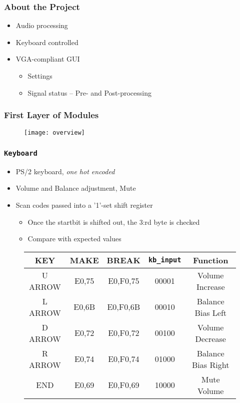 \begin{frame}
  \frametitle{About the Project}
    \begin{itemize}
      \item Audio processing
      \item Keyboard controlled
      \item VGA-compliant GUI
        \begin{itemize}
          \item Settings
          \item Signal status -- Pre- and Post-processing
        \end{itemize}
    \end{itemize}
\end{frame}

\begin{frame}
  \frametitle{First Layer of Modules}
    \begin{figure}
      \centering
      \texttt{[image: overview]}
    \end{figure}
\end{frame}

\begin{frame}
  \frametitle{\texttt{Keyboard}}
    \begin{itemize}
      \item PS/2 keyboard, \emph{one hot encoded}
      \item Volume and Balance adjustment, Mute
      \item Scan codes passed into a '1'-set shift register
        \begin{itemize}
          \item Once the startbit is shifted out, the 3:rd byte is checked
          \item Compare with expected values
        \end{itemize}
    \end{itemize}
    \begin{figure}
      \centering
      \begin{tabular}{|c|c|c|c|c|}
        \hline
        KEY & MAKE & BREAK & \texttt{kb\_input} & Function\\ \hline
        U ARROW & E0,75 & E0,F0,75 & 00001 & Volume Increase\\ \hline
        L ARROW & E0,6B & E0,F0,6B & 00010 & Balance Bias Left\\ \hline
        D ARROW & E0,72 & E0,F0,72 & 00100 & Volume Decrease\\ \hline
        R ARROW & E0,74 & E0,F0,74 & 01000 & Balance Bias Right\\ \hline
        END		& E0,69 & E0,F0,69 & 10000 & Mute Volume\\ \hline
      \end{tabular}
    \end{figure}
\end{frame}

